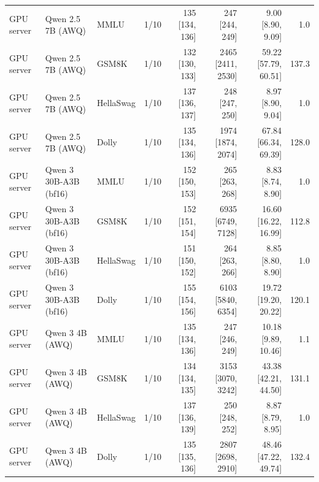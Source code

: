 \begin{longtable}{@{}l l l c r r r r@{}}
GPU server & Qwen 2.5 7B (AWQ) & MMLU & 1/10 & 135 [134, 136] & 247 [244, 249] & 9.00 [8.90, 9.09] & 1.0 \\
GPU server & Qwen 2.5 7B (AWQ) & GSM8K & 1/10 & 132 [130, 133] & 2465 [2411, 2530] & 59.22 [57.79, 60.51] & 137.3 \\
GPU server & Qwen 2.5 7B (AWQ) & HellaSwag & 1/10 & 137 [136, 137] & 248 [247, 250] & 8.97 [8.90, 9.04] & 1.0 \\
GPU server & Qwen 2.5 7B (AWQ) & Dolly & 1/10 & 135 [134, 136] & 1974 [1874, 2074] & 67.84 [66.34, 69.39] & 128.0 \\
GPU server & Qwen 3 30B-A3B (bf16) & MMLU & 1/10 & 152 [150, 153] & 265 [263, 268] & 8.83 [8.74, 8.90] & 1.0 \\
GPU server & Qwen 3 30B-A3B (bf16) & GSM8K & 1/10 & 152 [151, 154] & 6935 [6749, 7128] & 16.60 [16.22, 16.99] & 112.8 \\
GPU server & Qwen 3 30B-A3B (bf16) & HellaSwag & 1/10 & 151 [150, 152] & 264 [263, 266] & 8.85 [8.80, 8.90] & 1.0 \\
GPU server & Qwen 3 30B-A3B (bf16) & Dolly & 1/10 & 155 [154, 156] & 6103 [5840, 6354] & 19.72 [19.20, 20.22] & 120.1 \\
GPU server & Qwen 3 4B (AWQ) & MMLU & 1/10 & 135 [134, 136] & 247 [246, 249] & 10.18 [9.89, 10.46] & 1.1 \\
GPU server & Qwen 3 4B (AWQ) & GSM8K & 1/10 & 134 [134, 135] & 3153 [3070, 3242] & 43.38 [42.21, 44.50] & 131.1 \\
GPU server & Qwen 3 4B (AWQ) & HellaSwag & 1/10 & 137 [136, 139] & 250 [248, 252] & 8.87 [8.79, 8.95] & 1.0 \\
GPU server & Qwen 3 4B (AWQ) & Dolly & 1/10 & 135 [135, 136] & 2807 [2698, 2910] & 48.46 [47.22, 49.74] & 132.4 \\
\end{longtable}

